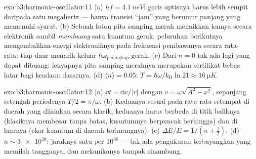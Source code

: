 \begin{solution}{exo:b3:harmonic-oscillator:11}
(a) $hf = \qty{4.1}{neV}$: garis optisnya harus lebih sempit daripada
satu megahertz --- hanya transisi ``jam'' yang berumur panjang yang
memenuhi syarat. (b)
Sebuah foton pita samping merah menaikkan ionnya secara elektronik
sambil \emph{membuang} satu kuantum gerak; peluruhan berikutnya
mengembalikan energi elektroniknya pada frekuensi pembawanya secara
rata-rata: tiap daur menarik keluar $\hbar\omega_{\text{perangkap}}$ gerak.
(c) Dari $n = 0$ tak ada lagi yang dapat dibuang: lenyapnya pita samping
merahnya merupakan sertifikat bebas latar bagi keadaan dasarnya. (d)
$\langle n\rangle = 0.05$: $T = \hbar\omega/k_{\text{B}}\ln21
\approx \qty{16}{\micro K}$.
\end{solution}

\begin{solution}{exo:b3:harmonic-oscillator:12}
(a) $\dd t = \dd x/|v|$ dengan $v = \omega\sqrt{A^2 - x^2}$, sepanjang
setengah periodenya $T/2 = \pi/\omega$. (b) Keduanya sesuai pada
rata-rata setempat di daerah yang diizinkan secara klasik; keduanya
harus berbeda di titik baliknya (klasiknya membesar tanpa batas,
kuantumnya berpuncak berhingga) dan di luarnya (ekor kuantum di daerah
terlarangnya). (c) $\Delta E/E = 1/(n +
\tfrac12)$. (d) $n \sim \num{3e30}$: jaraknya satu per $10^{30}$
--- tak ada pengukuran terbayangkan yang memilah tangganya, dan
mekanikanya tampak sinambung.
\end{solution}

